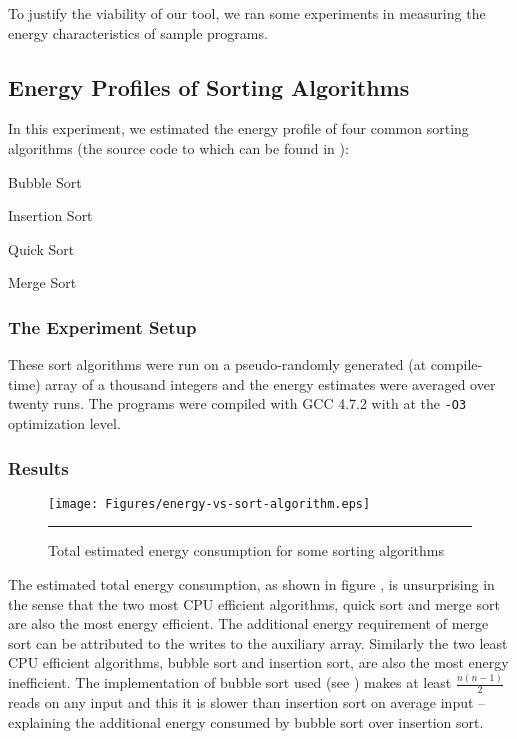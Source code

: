 To justify the viability of our tool, we ran some experiments in
measuring the energy characteristics of sample programs.

\subsection{Energy Profiles of Sorting Algorithms}

In this experiment, we estimated the energy profile of four common
sorting algorithms (the source code to which can be found in
):

\begin{itemize*}
\item Bubble Sort
\item Insertion Sort
\item Quick Sort
\item Merge Sort
\end{itemize*}

\subsubsection{The Experiment Setup}

These sort algorithms were run on a pseudo-randomly generated (at
compile-time) array of a thousand integers and the energy estimates
were averaged over twenty runs.  The programs were compiled with GCC
4.7.2 with at the \texttt{-O3} optimization level.

\subsubsection{Results}

\begin{figure}[htbp]
  \centering
  \texttt{[image: Figures/energy-vs-sort-algorithm.eps]}
  \rule{35em}{0.5pt}
  \caption{Total estimated energy consumption for some sorting algorithms}
  \label{fig:total-energy-sort-algo}
\end{figure}

The estimated total energy consumption, as shown in figure
, is unsurprising in the sense that
the two most CPU efficient algorithms, quick sort and merge sort are
also the most energy efficient.  The additional energy requirement of
merge sort can be attributed to the writes to the auxiliary array.
Similarly the two least CPU efficient algorithms, bubble sort and
insertion sort, are also the most energy inefficient.  The
implementation of bubble sort used (see
) makes at least $\frac{n (n - 1)}{2}$
reads on any input and this it is slower than insertion sort on
average input -- explaining the additional energy consumed by bubble
sort over insertion sort.

